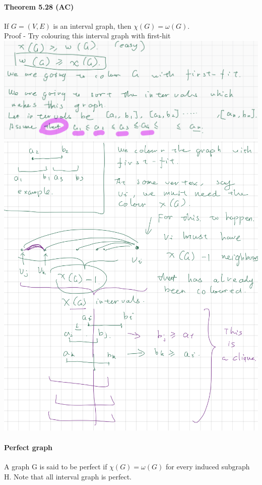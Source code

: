 \documentclass{article}
\begin{document}
\paragraph{Theorem 5.28 (AC)}
If $G=(V,E)$ is an interval graph, then $\chi(G)=\omega(G)$.\\
Proof - Try colouring this interval graph with first-hit\\
\includegraphics{0101}\\
\includegraphics{0102}
\paragraph{Perfect graph}
A graph G is said to be perfect if $\chi (G)=\omega(G)$ for every induced subgraph H.
Note that all interval graph is perfect.
\end{document}
